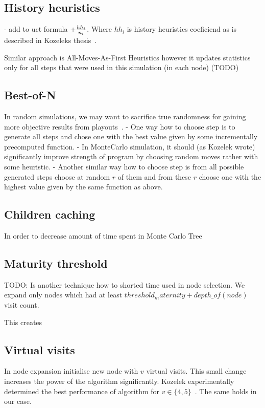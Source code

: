 \subsection{History heuristics}
- add to uct formula $+ {hh_i \over n_i}$. Where $hh_i$ is history
heuristics coeficiend as is described in Kozeleks thesis~\cite{KOZELEK}.

Similar approach is All-Moves-As-First Heuristics however it updates statistics only for all steps that were used in this simulation (in each node) (TODO)

\subsection{Best-of-N}
In random simulations, we may want to sacrifice true randomness for gaining
more objective results from playouts~\cite{HeavyPlayouts}.
	- One way how to choose step is to generate all steps and chose one with
	  the best value given by some incrementally precomputed function.
- In MonteCarlo simulation, it should (as Kozelek wrote) significantly improve
  strength of program by choosing random moves rather with some heuristic.
	- Another similar way how to choose step is from all possible generated
	  steps choose at random $r$ of them and from these $r$ choose one with the
	  highest value given by the same function as above.

\subsection{Children caching}
In order to decrease amount of time spent in Monte Carlo Tree 

\subsection{Maturity threshold}
TODO: Is another technique how to shorted time used in node selection. We
expand only nodes which had at least $threshold_maternity + depth\_of(node)$
visit count.

This creates 

\subsection{Virtual visits}
In node expansion initialise new node with $v$ virtual visits. This small
change increases the power of the algorithm significantly. Kozelek
experimentally determined the best performance of algorithm for $v \in
\{4,5\}$~\cite{KOZELEK}. The same holds in our case.

